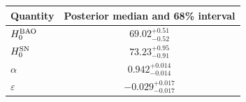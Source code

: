 \begin{tabular}{lc}
Quantity & Posterior median and 68\% interval \\
\hline
$H_0^{\rm BAO}$ & $69.02^{+0.51}_{-0.52}$ \\
$H_0^{\rm SN}$ & $73.23^{+0.95}_{-0.91}$ \\
$\alpha$ & $0.942^{+0.014}_{-0.014}$ \\
$\varepsilon$ & $-0.029^{+0.017}_{-0.017}$ \\
\end{tabular}
